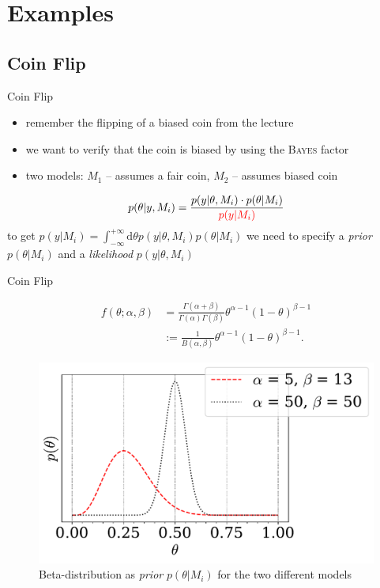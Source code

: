 \documentclass[11pt,aspectratio=1610,dvipsnames]{beamer}
\begin{document}
\section{Examples}

\subsection{Coin Flip}
\begin{frame}{Coin Flip }
	\begin{itemize}
		\item remember the flipping of a biased coin from the lecture
		\item we want to verify that the coin is biased by using the \textsc{Bayes} factor
		\item two models: $M_1$ -- assumes a fair coin, $M_2$ -- assumes biased coin
	\end{itemize}
	\begin{tcolorbox}[colback=black!5,colframe=gray!15!black,title=Posterior of the coin flip problem]
		\begin{equation}
			p(\theta|y,M_i)=\frac{p(y|\theta,M_i)\cdot p(\theta|M_i)}{\color{red}p(y|M_i)}
		\end{equation}
		to get $p(y|M_i)=\int_{-\infty}^{+\infty}\text{d}{\theta} p(y|{\theta},M_i)p({\theta}|M_i)$ we need to specify a \emph{prior} $p({\theta}|M_i)$ and a \emph{likelihood}  $p(y|{\theta},M_i)$
	\end{tcolorbox}
\end{frame}

\begin{frame}{Coin Flip }
	\begin{tcolorbox}[colback=black!5,colframe=gray!15!black,title=Choosing a prior]
	\begin{align*}f(\theta;\alpha,\beta)&=\frac{\Gamma(\alpha+\beta)}{\Gamma(\alpha)\Gamma(\beta)}\theta^{\alpha-1}(1-\theta)^{\beta-1}\\&:=\frac{1}{B(\alpha,\beta)}\theta^{\alpha-1}(1-\theta)^{\beta-1}.
	\end{align*}
	\end{tcolorbox}
	\begin{figure}[htbp]
		\centering
		\includegraphics[width=.5\linewidth]{beta_dist}
		\caption{Beta-distribution as \emph{prior} $p(\theta|M_i)$ for the two different models}
		\label{fig:beta_dist}
	\end{figure}
\end{frame}
\end{document}
